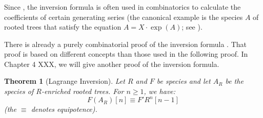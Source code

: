 \documentclass{amsart}
\newtheorem{thm}{Theorem}[section]
\theoremstyle{definition}
\theoremstyle{remark}
\begin{document}
\subsubsection{} Since \citet{polya1937kombinatorische}, the inversion
formula is often used in combinatorics to calculate the coefficients
of certain generating series (the canonical example is the species $A$
of rooted trees that satisfy the equation $A = X \cdot \exp (A)$; see
\citet{moon1970counting}).

There is already a purely combinatorial proof of the inversion formula
\citep{raney1960functional}. That proof is based on different concepts
than those used in the following proof. In Chapter 4 XXX, we will give
another proof of the inversion formula.

\begin{thm}[Lagrange Inversion]
  Let $R$ and $F$ be species and let $A_R$ be the species of
  $R$-enriched rooted trees. For $n \geq 1$, we have:
\[ F(A_R)[n] \equiv F' R^n[n-1] \]
(the $\equiv$ denotes equipotence).
\end{thm}
\end{document}
